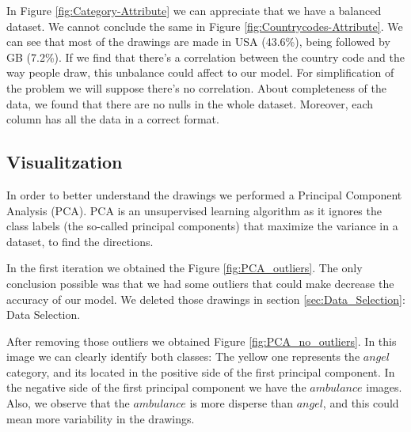 \documentclass{article}
\begin{document}
In Figure \ref{fig:Category-Attribute} we can appreciate that we have a balanced dataset. We cannot conclude the same in Figure \ref{fig:Countrycodes-Attribute}. We can see that most of the drawings are made in USA (43.6\%), being followed by GB (7.2\%). If we find that there's a correlation between the country code and the way people draw, this unbalance could affect to our model. For simplification of the problem we will suppose there's no correlation. About completeness of the data, we found that there are no nulls in the whole dataset. Moreover, each column has all the data in a correct format.

\subsection{Visualitzation}
In order to better understand the drawings we performed a Principal Component Analysis (PCA). PCA is an unsupervised learning algorithm as it ignores the class labels (the so-called principal components) that maximize the variance in a dataset, to find the directions.

In the first iteration we obtained the Figure \ref{fig:PCA_outliers}. The only conclusion possible was that we had some outliers that could make decrease the accuracy of our model. We deleted those drawings in section \ref{sec:Data_Selection}: Data Selection.

After removing those outliers we obtained Figure \ref{fig:PCA_no_outliers}. In this image we can clearly identify both classes: The yellow one represents the $angel$ category, and its located in the positive side of the first principal component. In the negative side of the first principal component we have the $ambulance$ images. Also, we observe that the $ambulance$ is more disperse than $angel$, and this could mean more variability in the drawings.
\end{document}
